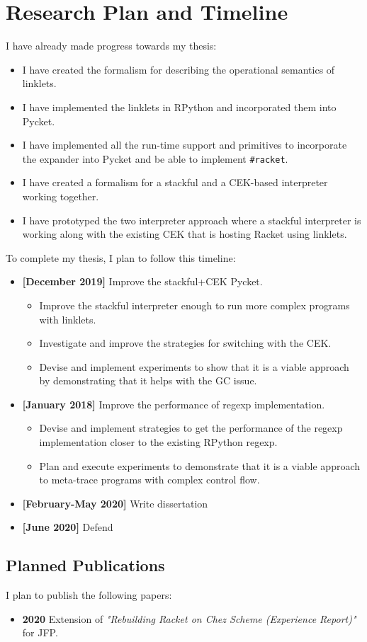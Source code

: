 \section{Research Plan and Timeline}
\label{sec:timeline}

I have already made progress towards my thesis:

\begin{itemize}
\item I have created the formalism for describing the operational
  semantics of linklets.
\item I have implemented the linklets in RPython and incorporated them into
  Pycket.
\item I have implemented all the run-time support and primitives to
  incorporate the expander into Pycket and be able to implement
  \texttt{\#racket}.
\item I have created a formalism for a stackful and a CEK-based
  interpreter working together.
\item I have prototyped the two interpreter approach where a stackful
  interpreter is working along with the existing CEK that is hosting
  Racket using linklets.
\end{itemize}

To complete my thesis, I plan to follow this timeline:

\begin{itemize}
  \item \textbf{[December 2019]} Improve the stackful+CEK Pycket.
    \begin{itemize}
    \item Improve the stackful interpreter enough to run more complex
      programs with linklets.
     \item Investigate and improve the strategies for switching with
       the CEK.
     \item Devise and implement experiments to show that it is a
       viable approach by demonstrating that it helps with the GC
       issue.
    \end{itemize}
  \item \textbf{[January 2018]} Improve the performance of regexp
    implementation.
    \begin{itemize}
      \item Devise and implement strategies to get the performance of
        the regexp implementation closer to the existing RPython
        regexp.
      \item Plan and execute experiments to demonstrate that it is a
        viable approach to meta-trace programs with complex control
        flow.
    \end{itemize}
  \item \textbf{[February-May 2020]} Write dissertation
  \item \textbf{[June 2020]} Defend
\end{itemize}

\subsection{Planned Publications}

I plan to publish the following papers:

\begin{itemize}
\item \textbf{2020} Extension of \emph{"Rebuilding Racket on Chez
  Scheme (Experience Report)"} \cite{racket-on-chez-19} for JFP.
\end{itemize}
